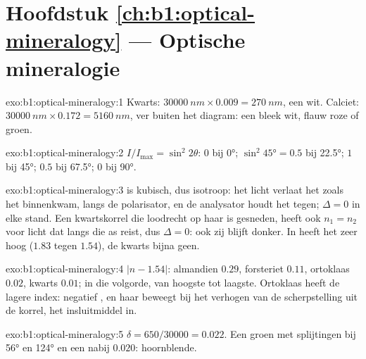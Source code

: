 \section*{Hoofdstuk \ref{ch:b1:optical-mineralogy} --- Optische mineralogie}

\begin{solution}{exo:b1:optical-mineralogy:1}
Kwarts: $\qty{30000}{nm}\times0.009 = \qty{270}{nm}$, een  wit.
Calciet: $\qty{30000}{nm}\times0.172 = \qty{5160}{nm}$, ver buiten het diagram:
een bleek  wit, flauw roze of groen.
\end{solution}

\begin{solution}{exo:b1:optical-mineralogy:2}
$I/I_{\max} = \sin^2 2\theta$: $0$ bij \ang{0}; $\sin^2\ang{45} = 0.5$ bij
\ang{22.5}; $1$ bij \ang{45}; $0.5$ bij \ang{67.5}; $0$ bij \ang{90}.
\end{solution}

\begin{solution}{exo:b1:optical-mineralogy:3}
 is kubisch, dus isotroop: het licht verlaat het zoals het binnenkwam, langs de
polarisator, en de analysator houdt het tegen; $\Delta = 0$ in elke stand. Een kwartskorrel die
loodrecht op haar  is gesneden, heeft ook $n_1 = n_2$ voor licht dat langs die as
reist, dus $\Delta = 0$: ook zij blijft donker. In  heeft het  zeer
hoog  ($1.83$ tegen $1.54$), de kwarts bijna geen.
\end{solution}

\begin{solution}{exo:b1:optical-mineralogy:4}
$|n - 1.54|$: almandien $0.29$, forsteriet $0.11$, ortoklaas $0.02$, kwarts
$0.01$;  in die volgorde, van hoogste tot laagste. Ortoklaas heeft de lagere
index: negatief , en haar  beweegt bij het verhogen van de scherpstelling uit de korrel,
het insluitmiddel in.
\end{solution}

\begin{solution}{exo:b1:optical-mineralogy:5}
$\delta = 650/30000 = 0.022$. Een groen   met splijtingen bij
\ang{56} en \ang{124} en een  nabij $0.020$: hoornblende.
\end{solution}

